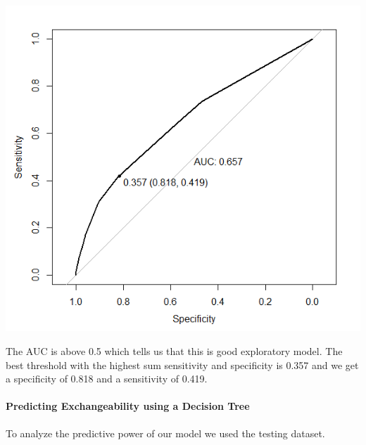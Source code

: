 \documentclass[
]{article}
\newenvironment{Shaded}{\begin{snugshade}}{\end{snugshade}}
\newcommand{\CommentTok}[1]{\textcolor[rgb]{0.56,0.35,0.01}{\textit{#1}}}
\newcommand{\FunctionTok}[1]{\textcolor[rgb]{0.00,0.00,0.00}{#1}}
\newcommand{\NormalTok}[1]{#1}
\newcommand{\OtherTok}[1]{\textcolor[rgb]{0.56,0.35,0.01}{#1}}
\newcommand{\SpecialCharTok}[1]{\textcolor[rgb]{0.00,0.00,0.00}{#1}}
\begin{document}
\includegraphics{images/Exchange QS/Decision Tree/DTExploratoryplot.Bestroc.png}

The AUC is above 0.5 which tells us that this is good exploratory model.
The best threshold with the highest sum sensitivity and specificity is
0.357 and we get a specificity of 0.818 and a sensitivity of 0.419.

\hypertarget{predicting-exchangeability-using-a-decision-tree}{%
\paragraph{Predicting Exchangeability using a Decision
Tree}\label{predicting-exchangeability-using-a-decision-tree}}

To analyze the predictive power of our model we used the testing
dataset.

\begin{Shaded}
\end{Shaded}
\end{document}
